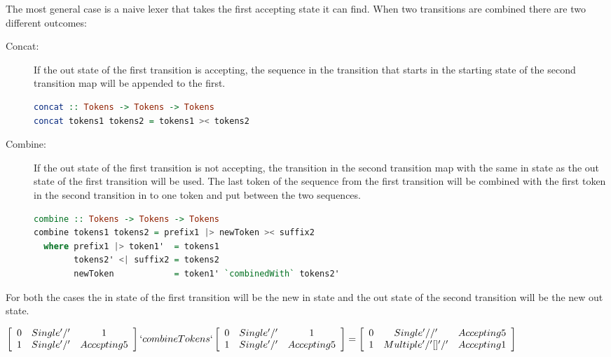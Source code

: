 The most general case is a naive lexer that takes the first accepting state it
can find. When two transitions are combined there are two different outcomes:
\begin{description} 
  \item[Concat:]If the out state of the first transition is accepting, the
    sequence in the transition that starts in the starting state of the second
    transition map will be appended to the first.
\begin{lstlisting}[language=Haskell, mathescape=true]
concat :: Tokens -> Tokens -> Tokens 
concat tokens1 tokens2 = tokens1 >< tokens2
\end{lstlisting}

  \item[Combine:]If the out state of the first transition is not accepting, the
    transition in the second transition map with the same in state as the out
    state of the first transition will be used. The last token of the sequence
    from the first transition will be combined with the first token in the second
    transition in to one token and put between the two sequences.\\

\begin{lstlisting}[language=Haskell, mathescape=true]
combine :: Tokens -> Tokens -> Tokens 
combine tokens1 tokens2 = prefix1 |> newToken >< suffix2
  where prefix1 |> token1'  = tokens1
        tokens2' <| suffix2 = tokens2
        newToken            = token1' `combinedWith` tokens2'
\end{lstlisting}

\end{description}
For both the cases the in state of the first transition will be the new in state
and the out state of the second transition will be the new out state.
\begin{center}
$\left[\begin{array}{ccc}
0&Single '/'&1\\
1&Single '/'&Accepting 5\\
\end{array}\right] `combineTokens`
\left[\begin{array}{ccc}
0&Single '/'&1\\
1&Single '/'&Accepting 5\\
\end{array}\right] =
\left[\begin{array}{ccc}
0&Single '//'&Accepting 5\\
1&Multiple '/' [] '/'&Accepting 1\\
\end{array}\right]$
\end{center}
